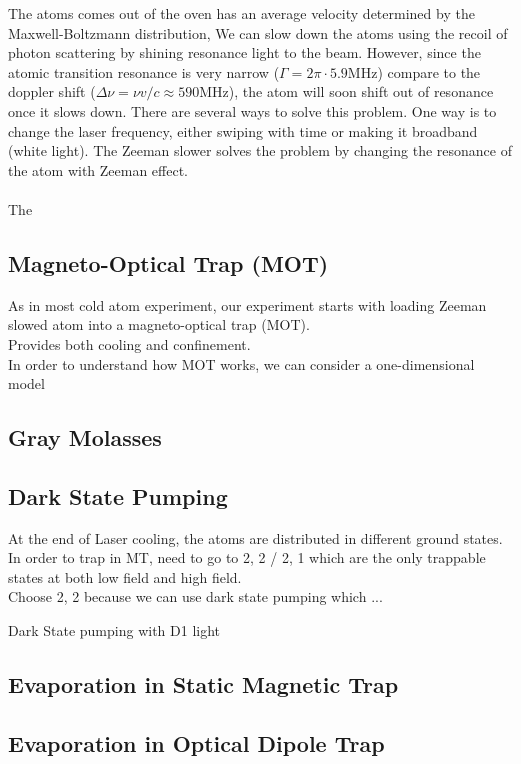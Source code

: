 The atoms comes out of the oven has an average velocity determined by the Maxwell-Boltzmann distribution,
We can slow down the atoms using the recoil of photon scattering by shining resonance light to the beam. However, since the atomic transition resonance is very narrow ($\Gamma=2\pi\cdot5.9\text{MHz}$) compare to the doppler shift ($\Delta\nu=\nu v/c\approx590\text{MHz}$), the atom will soon shift out of resonance once it slows down. There are several ways to solve this problem. One way is to change the laser frequency, either swiping with time or making it broadband (white light). The Zeeman slower solves the problem by changing the resonance of the atom with Zeeman effect.\\
\\
The

\subsection{Magneto-Optical Trap (MOT)}\label{theory:mot}

As in most cold atom experiment, our experiment starts with loading Zeeman slowed atom into a magneto-optical trap (MOT).\\
Provides both cooling and confinement.\\
In order to understand how MOT works, we can consider a one-dimensional model\\

\subsection{Gray Molasses}\label{theory:gm}

\subsection{Dark State Pumping}\label{theory:pump}
At the end of Laser cooling, the atoms are distributed in different ground states.\\
In order to trap in MT, need to go to 2, 2 / 2, 1 which are the only trappable states at both low field and high field.\\
Choose 2, 2 because we can use dark state pumping which ...

Dark State pumping with D1 light

\subsection{Evaporation in Static Magnetic Trap}\label{theory:mt}

\subsection{Evaporation in Optical Dipole Trap}\label{theory:odt}
